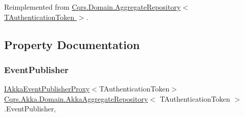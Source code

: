 Reimplemented from \hyperlink{classCqrs_1_1Domain_1_1AggregateRepository_a3191ba3d6fa4f6b904128c4731262944_a3191ba3d6fa4f6b904128c4731262944}{Cqrs.\+Domain.\+Aggregate\+Repository$<$ T\+Authentication\+Token $>$}.



\subsection{Property Documentation}
\mbox{\label{classCqrs_1_1Akka_1_1Domain_1_1AkkaAggregateRepository_a6c6400aef33fd3ec5dc3e479ebec6b40_a6c6400aef33fd3ec5dc3e479ebec6b40}} 
\subsubsection{\texorpdfstring{Event\+Publisher}{EventPublisher}}
{\footnotesize\ttfamily \hyperlink{interfaceCqrs_1_1Akka_1_1Events_1_1IAkkaEventPublisherProxy}{I\+Akka\+Event\+Publisher\+Proxy}$<$T\+Authentication\+Token$>$ \hyperlink{classCqrs_1_1Akka_1_1Domain_1_1AkkaAggregateRepository}{Cqrs.\+Akka.\+Domain.\+Akka\+Aggregate\+Repository}$<$ T\+Authentication\+Token $>$.Event\+Publisher\hspace{0.3cm}{\ttfamily [get]}, {\ttfamily [protected]}}

